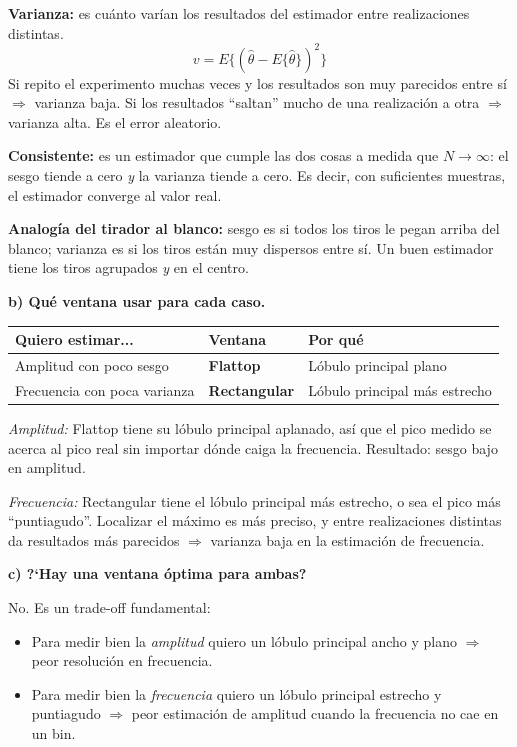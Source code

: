 \documentclass[11pt, a4paper]{article}
\begin{document}
\textbf{Varianza:} es cu\'anto var\'ian los resultados del estimador entre
realizaciones distintas.
\[
  v = E\{(\hat{\theta} - E\{\hat{\theta}\})^2\}
\]
Si repito el experimento muchas veces y los resultados son muy parecidos
entre s\'i $\Rightarrow$ varianza baja.
Si los resultados ``saltan'' mucho de una realizaci\'on a otra $\Rightarrow$
varianza alta. Es el error aleatorio.

\textbf{Consistente:} es un estimador que cumple las dos cosas a medida que
$N \to \infty$: el sesgo tiende a cero \emph{y} la varianza tiende a cero.
Es decir, con suficientes muestras, el estimador converge al valor real.

\textbf{Analog\'ia del tirador al blanco:} sesgo es si todos los tiros le pegan
arriba del blanco; varianza es si los tiros est\'an muy dispersos entre s\'i.
Un buen estimador tiene los tiros agrupados \emph{y} en el centro.

\textbf{b) Qu\'e ventana usar para cada caso.}

\begin{center}
\begin{tabular}{lll}
\toprule
Quiero estimar... & Ventana & Por qu\'e \\
\midrule
Amplitud con poco sesgo   & \textbf{Flattop}     & L\'obulo principal plano \\
Frecuencia con poca varianza & \textbf{Rectangular} & L\'obulo principal m\'as estrecho \\
\bottomrule
\end{tabular}
\end{center}

\emph{Amplitud:} Flattop tiene su l\'obulo principal aplanado, as\'i que el pico
medido se acerca al pico real sin importar d\'onde caiga la frecuencia.
Resultado: sesgo bajo en amplitud.

\emph{Frecuencia:} Rectangular tiene el l\'obulo principal m\'as estrecho,
o sea el pico m\'as ``puntiagudo''.
Localizar el m\'aximo es m\'as preciso, y entre realizaciones distintas
da resultados m\'as parecidos $\Rightarrow$ varianza baja en la
estimaci\'on de frecuencia.

\textbf{c) ?`Hay una ventana \'optima para ambas?}

No. Es un trade-off fundamental:
\begin{itemize}
  \item Para medir bien la \emph{amplitud} quiero un l\'obulo principal
    ancho y plano $\Rightarrow$ peor resoluci\'on en frecuencia.
  \item Para medir bien la \emph{frecuencia} quiero un l\'obulo principal
    estrecho y puntiagudo $\Rightarrow$ peor estimaci\'on de amplitud
    cuando la frecuencia no cae en un bin.
\end{itemize}
\end{document}
